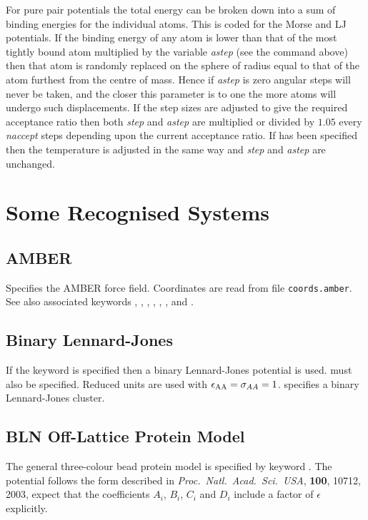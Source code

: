{For pure pair potentials the total energy can be broken down into a sum of binding
energies for the individual atoms. This is coded for the Morse and LJ potentials.
If the binding energy of any atom is lower than that of the most tightly bound atom
multiplied by the variable {\it astep\/} (see the {\/} command above) then
that atom is randomly replaced on the sphere of radius equal to that of the atom furthest
from the centre of mass. Hence if {\it astep\/} is zero angular steps will never be taken,
and the closer this parameter is to one the more atoms will undergo such displacements.
If the step sizes are adjusted to give the required acceptance ratio then both {\it step\/} and
{\it astep\/} are multiplied or divided by $1.05$ every {\it naccept\/} steps depending
upon the current acceptance ratio. If {\/} has been specified then the temperature
is adjusted in the same way and {\it step\/} and {\it astep\/} are unchanged.

\section{Some Recognised Systems}

\subsection{AMBER}

Specifies the AMBER force field. Coordinates are read from file {\tt coords.amber}.
See also associated keywords {\/}, {\/}, {\/}, {\/},
{\/}, {\/}, {\/} and {\/}.

\subsection{Binary Lennard-Jones}

If the {\/} keyword is specified then a binary Lennard-Jones
potential is used\cite{sastryds98}. {\/} must also be
specified. Reduced units are used with $\epsilon_{\rm AA}=\sigma_{AA}=1$.
{\/} specifies a binary Lennard-Jones cluster.

\subsection{BLN Off-Lattice Protein Model}
\label{sec:BLN}

The general three-colour bead protein model is specified by keyword {}.
The potential follows the form described in
{\it Proc.~Natl.~Acad.~Sci.~USA}, {\bf 100}, 10712, 2003, expect that
the coefficients $A_i$, $B_i$, $C_i$ and $D_i$ include a factor of $\epsilon$
explicitly.

}
